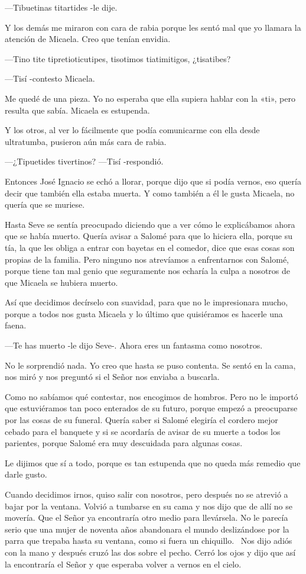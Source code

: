 \documentclass{barcodevapor3pags}
\begin{document}
---Tibuetinas titartides -le dije.~

Y los demás me miraron con cara de rabia porque les sentó mal que yo
llamara la atención de Micaela. Creo que tenían envidia.~

---Tino tite tipretioticutipes, tisotimos tiatimitigos, ¿tisatibes?~

---Tisí -contesto Micaela.~

Me quedé de una pieza. Yo no esperaba que ella supiera hablar con la
«ti», pero resulta que sabía. Micaela es estupenda.~

Y los otros, al ver lo fácilmente que podía comunicarme con ella desde
ultratumba, pusieron aún más cara de rabia.~

---¿Tipuetides tivertinos? ---Tisí -respondió.~

Entonces José Ignacio se echó a llorar, porque dijo que si podía vernos,
eso quería decir que también ella estaba muerta. Y como también a él le
gusta Micaela, no quería que se muriese.~

Hasta Seve se sentía preocupado diciendo que a ver cómo le explicábamos
ahora que se había muerto. Quería avisar a Salomé para que lo hiciera
ella, porque su tía, la que les obliga a entrar con bayetas en el
comedor, dice que esas cosas son propias de la familia. Pero ninguno nos
atrevíamos a enfrentarnos con Salomé, porque tiene tan mal genio que
seguramente nos echaría la culpa a nosotros de que Micaela se hubiera
muerto.~

Así que decidimos decírselo con suavidad, para que no le impresionara
mucho, porque a todos nos gusta Micaela y lo último que quisiéramos es
hacerle una faena.~

---Te has muerto -le dijo Seve-. Ahora eres un fantasma como nosotros.~

No le sorprendió nada. Yo creo que hasta se puso contenta. Se sentó en
la cama, nos miró y nos preguntó si el Señor nos enviaba a buscarla.~

Como no sabíamos qué contestar, nos encogimos de hombros. Pero no le
importó que estuviéramos tan poco enterados de su futuro, porque empezó
a preocuparse por las cosas de su funeral. Quería saber si Salomé
elegiría el cordero mejor cebado para el banquete y si se acordaría de
avisar de su muerte a todos los parientes, porque Salomé era muy
descuidada para algunas cosas.~

Le dijimos que sí a todo, porque es tan estupenda que no queda más
remedio que darle gusto.~

Cuando decidimos irnos, quiso salir con nosotros, pero después no se
atrevió a bajar por la ventana. Volvió a tumbarse en su cama y nos dijo
que de allí no se movería. Que el Señor ya encontraría otro medio para
llevársela. No le parecía serio que una mujer de noventa años abandonara
el mundo deslizándose por la parra que trepaba hasta su ventana, como si
fuera un chiquillo.~
Nos dijo adiós con la mano y después cruzó las dos sobre el pecho. Cerró
los ojos y dijo que así la encontraría el Señor y que esperaba volver a
vernos en el cielo.~
\end{document}
